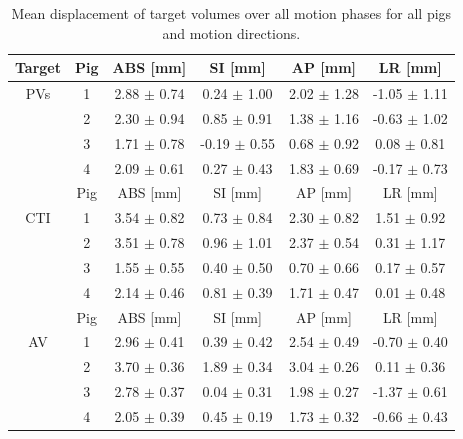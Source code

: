 \documentclass[type=dr, dr=rernat, accentcolor=tud7b,colorbacktitle, bigchapter, openright, twoside, 12pt ]{tudthesis}
\begin{document}
\vspace*{-0.4cm}


\begin{table}[H]
  \centering
  \small
  \caption{Mean displacement of target volumes over all motion phases for all pigs and motion directions.}
  \begin{tabular}{|c|c|c|c|c|c|}
    \hline\hline
    Target & Pig & ABS [mm] & SI [mm] & AP [mm] & LR [mm] \\
    \hline
    PVs & 1 & 2.88 $\pm$ 0.74 & 0.24 $\pm$ 1.00 & 2.02 $\pm$ 1.28 & -1.05 $\pm$ 1.11 \\
    & 2 & 2.30 $\pm$ 0.94 & 0.85 $\pm$ 0.91 & 1.38 $\pm$ 1.16 & -0.63 $\pm$ 1.02 \\
    & 3 & 1.71 $\pm$ 0.78 & -0.19 $\pm$ 0.55 & 0.68 $\pm$ 0.92 & 0.08 $\pm$ 0.81 \\
    & 4 & 2.09 $\pm$ 0.61 & 0.27 $\pm$ 0.43 & 1.83 $\pm$ 0.69 & -0.17 $\pm$ 0.73 \\
    \hline\hline
    & Pig & ABS [mm] & SI [mm] & AP [mm] & LR [mm] \\
   \hline
    CTI & 1 & 3.54 $\pm$ 0.82 & 0.73 $\pm$ 0.84 & 2.30 $\pm$ 0.82 & 1.51 $\pm$ 0.92 \\
    & 2 & 3.51 $\pm$ 0.78 & 0.96 $\pm$ 1.01 & 2.37 $\pm$ 0.54 & 0.31 $\pm$ 1.17 \\
    & 3 & 1.55 $\pm$ 0.55 & 0.40 $\pm$ 0.50 & 0.70 $\pm$ 0.66 & 0.17 $\pm$ 0.57 \\
    & 4 & 2.14 $\pm$ 0.46 & 0.81 $\pm$ 0.39 & 1.71 $\pm$ 0.47 & 0.01 $\pm$ 0.48 \\
    \hline\hline
   & Pig & ABS [mm] & SI [mm] & AP [mm] & LR [mm] \\
   \hline
    AV & 1 & 2.96 $\pm$ 0.41 & 0.39 $\pm$ 0.42 & 2.54 $\pm$ 0.49 & -0.70 $\pm$ 0.40 \\
    & 2 & 3.70 $\pm$ 0.36 & 1.89 $\pm$ 0.34 & 3.04 $\pm$ 0.26 & 0.11 $\pm$ 0.36 \\
    & 3 & 2.78 $\pm$ 0.37 & 0.04 $\pm$ 0.31 & 1.98 $\pm$ 0.27 & -1.37 $\pm$ 0.61 \\
    & 4 & 2.05 $\pm$ 0.39 & 0.45 $\pm$ 0.19 & 1.73 $\pm$ 0.32 & -0.66 $\pm$ 0.43 \\
    \hline\hline
  \end{tabular}
  \label{tab:motion_allpigs}
\end{table}

\end{document}
